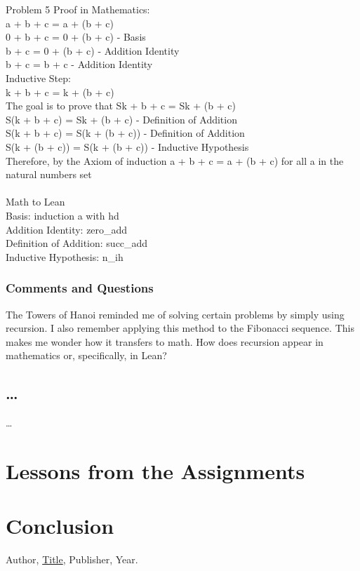 \documentclass{article}
\theoremstyle{theorem}
\theoremstyle{definition}
\theoremstyle{remark}
\begin{document}
Problem 5 Proof in Mathematics:\\
a + b + c =  a + (b + c)\\
0 + b + c = 0 + (b + c) - Basis\\
b + c = 0 + (b + c) - Addition Identity\\
b + c = b + c - Addition Identity\\
Inductive Step:\\
k + b + c = k + (b + c)\\
The goal is to prove that Sk + b + c = Sk + (b + c)\\
S(k + b + c) = Sk + (b + c) - Definition of Addition\\
S(k + b + c) = S(k + (b + c)) - Definition of Addition\\
S(k + (b + c)) = S(k + (b + c)) - Inductive Hypothesis\\
Therefore, by the Axiom of induction a + b + c =  a + (b + c) for all a in the natural numbers set\\
\\
Math to Lean\\
Basis: induction a with hd\\
Addition Identity: zero\_add\\
Definition of Addition: succ\_add\\
Inductive Hypothesis: n\_ih\\

\subsubsection*{Comments and Questions}
The Towers of Hanoi reminded me of solving certain problems by simply using recursion. 
I also remember applying this method to the Fibonacci sequence. This makes me wonder 
how it transfers to math. How does recursion appear in mathematics or, specifically, in Lean?
\subsection{\ldots}

\ldots

\section{Lessons from the Assignments}


\section{Conclusion}\label{conclusion}


\begin{thebibliography}{99}
 Author, \href{https://en.wikipedia.org/wiki/LaTeX}{Title}, Publisher, Year.
\end{thebibliography}
\end{document}

